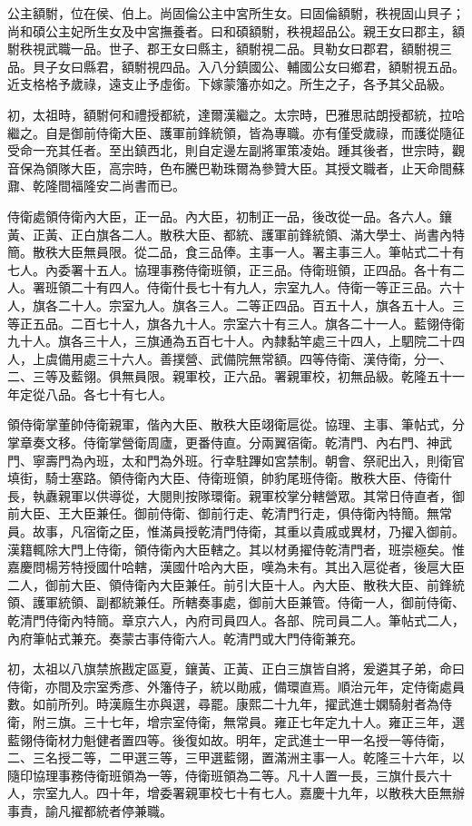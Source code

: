 \begin{pinyinscope}
公主額駙，位在侯、伯上。尚固倫公主中宮所生女。曰固倫額駙，秩視固山貝子；尚和碩公主妃所生女及中宮撫養者。曰和碩額駙，秩視超品公。親王女曰郡主，額駙秩視武職一品。世子、郡王女曰縣主，額駙視二品。貝勒女曰郡君，額駙視三品。貝子女曰縣君，額駙視四品。入八分鎮國公、輔國公女曰鄉君，額駙視五品。近支格格予歲祿，遠支止予虛銜。下嫁蒙籓亦如之。所生之子，各予其父品級。

初，太祖時，額駙何和禮授都統，達爾漢繼之。太宗時，巴雅思祜朗授都統，拉哈繼之。自是御前侍衛大臣、護軍前鋒統領，皆為專職。亦有僅受歲祿，而護從隨征受命一充其任者。至出鎮西北，則自定邊左副將軍策凌始。踵其後者，世宗時，觀音保為領隊大臣，高宗時，色布騰巴勒珠爾為參贊大臣。其授文職者，止天命間蘇鼐、乾隆間福隆安二尚書而已。

侍衛處領侍衛內大臣，正一品。內大臣，初制正一品，後改從一品。各六人。鑲黃、正黃、正白旗各二人。散秩大臣、都統、護軍前鋒統領、滿大學士、尚書內特簡。散秩大臣無員限。從二品，食三品俸。主事一人。署主事三人。筆帖式二十有七人。內委署十五人。協理事務侍衛班領，正三品。侍衛班領，正四品。各十有二人。署班領二十有四人。侍衛什長七十有九人，宗室九人。侍衛一等正三品。六十人，旗各二十人。宗室九人。旗各三人。二等正四品。百五十人，旗各五十人。三等正五品。二百七十人，旗各九十人。宗室六十有三人。旗各二十一人。藍翎侍衛九十人。旗各三十人，三旗通為五百七十人。內隸黏竿處三十四人，上駟院二十四人，上虞備用處三十六人。善撲營、武備院無常額。四等侍衛、漢侍衛，分一、二、三等及藍翎。俱無員限。親軍校，正六品。署親軍校，初無品級。乾隆五十一年定從八品。各七十有七人。

領侍衛掌董帥侍衛親軍，偕內大臣、散秩大臣翊衛扈從。協理、主事、筆帖式，分掌章奏文移。侍衛掌營衛周廬，更番侍直。分兩翼宿衛。乾清門、內右門、神武門、寧壽門為內班，太和門為外班。行幸駐蹕如宮禁制。朝會、祭祀出入，則衛官填街，騎士塞路。領侍衛內大臣、侍衛班領，帥豹尾班侍衛。散秩大臣、侍衛什長，執纛親軍以供導從，大閱則按隊環衛。親軍校掌分轄營眾。其常日侍直者，御前大臣、王大臣兼任。御前侍衛、御前行走、乾清門行走，俱侍衛內特簡。無常員。故事，凡宿衛之臣，惟滿員授乾清門侍衛，其重以貴戚或異材，乃擢入御前。漢籍輒除大門上侍衛，領侍衛內大臣轄之。其以材勇擢侍乾清門者，班崇極矣。惟嘉慶問楊芳特授國什哈轄，漢國什哈內大臣，嘆為未有。其出入扈從者，後扈大臣二人，御前大臣、領侍衛內大臣兼任。前引大臣十人。內大臣、散秩大臣、前鋒統領、護軍統領、副都統兼任。所轄奏事處，御前大臣兼管。侍衛一人，御前侍衛、乾清門侍衛內特簡。章京六人，內府司員四人。各部、院司員二人。筆帖式二人，內府筆帖式兼充。奏蒙古事侍衛六人。乾清門或大門侍衛兼充。

初，太祖以八旗禁旅戡定區夏，鑲黃、正黃、正白三旗皆自將，爰遴其子弟，命曰侍衛，亦間及宗室秀彥、外籓侍子，統以勛戚，備環直焉。順治元年，定侍衛處員數。如前所列。時漢廕生亦與選，尋罷。康熙二十九年，擢武進士嫻騎射者為侍衛，附三旗。三十七年，增宗室侍衛，無常員。雍正七年定九十人。雍正三年，選藍翎侍衛材力魁健者置四等。後復如故。明年，定武進士一甲一名授一等侍衛，二、三名授二等，二甲選三等，三甲選藍翎，置滿洲主事一人。乾隆三十六年，以隨印協理事務侍衛班領為一等，侍衛班領為二等。凡十人置一長，三旗什長六十人，宗室九人。四十年，增委署親軍校七十有七人。嘉慶十九年，以散秩大臣無辦事責，諭凡擢都統者停兼職。


\end{pinyinscope}
